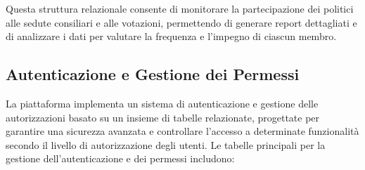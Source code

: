 Questa struttura relazionale consente di monitorare la partecipazione dei politici alle sedute consiliari e alle votazioni, permettendo di generare report dettagliati e di analizzare i dati per valutare la frequenza e l'impegno di ciascun membro.

\subsection{Autenticazione e Gestione dei Permessi}
La piattaforma implementa un sistema di autenticazione e gestione delle autorizzazioni basato su un insieme di tabelle relazionate, progettate per garantire una sicurezza avanzata e controllare l’accesso a determinate funzionalità secondo il livello di autorizzazione degli utenti. Le tabelle principali per la gestione dell’autenticazione e dei permessi includono:

